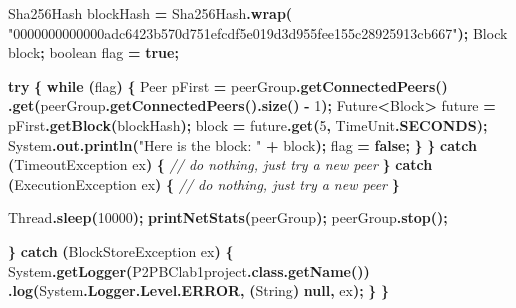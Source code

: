\documentclass[
  italian,
  openany]{book}
\newenvironment{Shaded}{\begin{snugshade}}{\end{snugshade}}
\newcommand{\BuiltInTok}[1]{#1}
\newcommand{\CommentTok}[1]{\textcolor[rgb]{0.56,0.35,0.01}{\textit{#1}}}
\newcommand{\ControlFlowTok}[1]{\textcolor[rgb]{0.13,0.29,0.53}{\textbf{#1}}}
\newcommand{\DataTypeTok}[1]{\textcolor[rgb]{0.13,0.29,0.53}{#1}}
\newcommand{\DecValTok}[1]{\textcolor[rgb]{0.00,0.00,0.81}{#1}}
\newcommand{\FunctionTok}[1]{\textcolor[rgb]{0.13,0.29,0.53}{\textbf{#1}}}
\newcommand{\KeywordTok}[1]{\textcolor[rgb]{0.13,0.29,0.53}{\textbf{#1}}}
\newcommand{\NormalTok}[1]{#1}
\newcommand{\OperatorTok}[1]{\textcolor[rgb]{0.81,0.36,0.00}{\textbf{#1}}}
\newcommand{\StringTok}[1]{\textcolor[rgb]{0.31,0.60,0.02}{#1}}
\begin{document}
\begin{Shaded}
\begin{Highlighting}[]
\NormalTok{        Sha256Hash blockHash }\OperatorTok{=}\NormalTok{ Sha256Hash}\OperatorTok{.}\FunctionTok{wrap}\OperatorTok{(}
            \StringTok{"0000000000000adc6423b570d751efcdf5e019d3d955fee155c28925913cb667"}\OperatorTok{);}
\NormalTok{        Block block}\OperatorTok{;}
        \DataTypeTok{boolean}\NormalTok{ flag }\OperatorTok{=} \KeywordTok{true}\OperatorTok{;}

        \ControlFlowTok{try} \OperatorTok{\{}
            \ControlFlowTok{while} \OperatorTok{(}\NormalTok{flag}\OperatorTok{)} \OperatorTok{\{}
\NormalTok{                Peer pFirst }\OperatorTok{=}\NormalTok{ peerGroup}\OperatorTok{.}\FunctionTok{getConnectedPeers}\OperatorTok{()}
                    \OperatorTok{.}\FunctionTok{get}\OperatorTok{(}\NormalTok{peerGroup}\OperatorTok{.}\FunctionTok{getConnectedPeers}\OperatorTok{().}\FunctionTok{size}\OperatorTok{()} \OperatorTok{{-}} \DecValTok{1}\OperatorTok{);}
                \BuiltInTok{Future}\OperatorTok{\textless{}}\NormalTok{Block}\OperatorTok{\textgreater{}}\NormalTok{ future }\OperatorTok{=}\NormalTok{ pFirst}\OperatorTok{.}\FunctionTok{getBlock}\OperatorTok{(}\NormalTok{blockHash}\OperatorTok{);}
\NormalTok{                block }\OperatorTok{=}\NormalTok{ future}\OperatorTok{.}\FunctionTok{get}\OperatorTok{(}\DecValTok{5}\OperatorTok{,} \BuiltInTok{TimeUnit}\OperatorTok{.}\FunctionTok{SECONDS}\OperatorTok{);}
                \BuiltInTok{System}\OperatorTok{.}\FunctionTok{out}\OperatorTok{.}\FunctionTok{println}\OperatorTok{(}\StringTok{"Here is the block: "} \OperatorTok{+}\NormalTok{ block}\OperatorTok{);}
\NormalTok{                flag }\OperatorTok{=} \KeywordTok{false}\OperatorTok{;}
            \OperatorTok{\}}
        \OperatorTok{\}} \ControlFlowTok{catch} \OperatorTok{(}\BuiltInTok{TimeoutException}\NormalTok{ ex}\OperatorTok{)} \OperatorTok{\{}
            \CommentTok{// do nothing, just try a new peer}
        \OperatorTok{\}} \ControlFlowTok{catch} \OperatorTok{(}\BuiltInTok{ExecutionException}\NormalTok{ ex}\OperatorTok{)} \OperatorTok{\{}
            \CommentTok{// do nothing, just try a new peer}
        \OperatorTok{\}}

        \BuiltInTok{Thread}\OperatorTok{.}\FunctionTok{sleep}\OperatorTok{(}\DecValTok{10000}\OperatorTok{);}
        \FunctionTok{printNetStats}\OperatorTok{(}\NormalTok{peerGroup}\OperatorTok{);}
\NormalTok{        peerGroup}\OperatorTok{.}\FunctionTok{stop}\OperatorTok{();}

    \OperatorTok{\}} \ControlFlowTok{catch} \OperatorTok{(}\NormalTok{BlockStoreException ex}\OperatorTok{)} \OperatorTok{\{}
        \BuiltInTok{System}\OperatorTok{.}\FunctionTok{getLogger}\OperatorTok{(}\NormalTok{P2PBClab1project}\OperatorTok{.}\FunctionTok{class}\OperatorTok{.}\FunctionTok{getName}\OperatorTok{())}
            \OperatorTok{.}\FunctionTok{log}\OperatorTok{(}\BuiltInTok{System}\OperatorTok{.}\FunctionTok{Logger}\OperatorTok{.}\FunctionTok{Level}\OperatorTok{.}\FunctionTok{ERROR}\OperatorTok{,} \OperatorTok{(}\BuiltInTok{String}\OperatorTok{)} \KeywordTok{null}\OperatorTok{,}\NormalTok{ ex}\OperatorTok{);}
    \OperatorTok{\}}
\OperatorTok{\}}


\end{Highlighting}
\end{Shaded}
\end{document}
